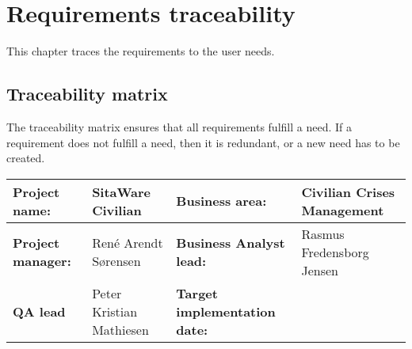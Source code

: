 \chapter{Requirements traceability}
This chapter traces the requirements to the user needs.

\section{Traceability matrix}
The traceability matrix ensures that all requirements fulfill a need. If a requirement does not fulfill a need, then it is redundant, or a new need has to be created.


\begin{sidewaystable}
\begin{table}[H]
\begin{tabular}{|l|l|l|l|}
\hline
 \textbf{Project name:} & SitaWare Civilian & \textbf{Business area:}  & Civilian Crises Management\\ \hline
 \textbf{Project manager:} & René Arendt Sørensen & \textbf{Business Analyst lead:} & Rasmus Fredensborg  Jensen\\ \hline
 \textbf{QA lead} & Peter Kristian Mathiesen & \textbf{Target implementation date:}  & \\ \hline
\end{tabular}	
\end{table}


\end{sidewaystable}
